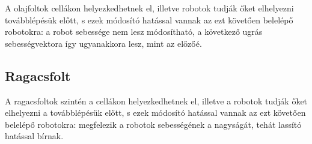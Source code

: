 A olajfoltok cellákon helyezkedhetnek el, illetve robotok tudják őket elhelyezni továbblépésük előtt, s ezek módosító hatással vannak az ezt követően belelépő robotokra: a robot sebessége nem lesz módosítható, a következő ugrás sebességvektora így ugyanakkora lesz, mint az előzőé.

\subsection{Ragacsfolt}

A ragacsfoltok szintén a cellákon helyezkedhetnek el, illetve a robotok tudják őket elhelyezni a továbblépésük előtt, s ezek módosító hatással vannak az ezt követően belelépő robotokra: megfelezik a robotok sebességének a nagyságát, tehát lassító hatással bírnak.

